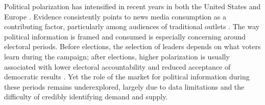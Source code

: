 \documentclass[12pt]{article}
\begin{document}

	Political polarization has intensified in recent years  in both  the United States and Europe \citep{Reiljan2019FearAL}. Evidence consistently points to news media consumption as a contributing factor, particularly among audiences of traditional outlets \citep[][]{martin2017,Boxell2020CrossCountryTI,schneider2025media}. The way political information is framed and consumed is especially concerning around electoral periods. Before elections,  the selection of leaders depends on what voters learn during the campaign; after elections, higher polarization is usually associated with lower electoral accountability and reduced acceptance of democratic results \citep{Besley2005,Graham2019DemocracyIA}. Yet the role of the market for political information during these periods remains underexplored, largely due to data limitations and the difficulty of credibly identifying demand and supply.
	

	
\end{document}
